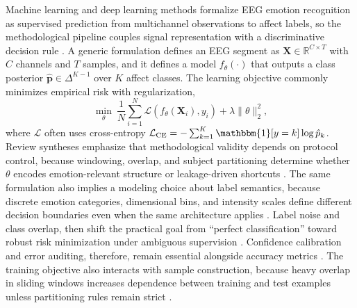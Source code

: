 \documentclass{WileyMSP-template}
\begin{document}
Machine learning and deep learning methods formalize EEG emotion recognition as supervised prediction from multichannel observations to affect labels, so the methodological pipeline couples signal representation with a discriminative decision rule \cite{smalar2019emotions}. A generic formulation defines an EEG segment as $\mathbf{X}\in\mathbb{R}^{C\times T}$ with $C$ channels and $T$ samples, and it defines a model $f_\theta(\cdot)$ that outputs a class posterior $\hat{\mathbf{p}}\in\Delta^{K-1}$ over $K$ affect classes. The learning objective commonly minimizes empirical risk with regularization,
\begin{equation}
\min_{\theta}\ \frac{1}{N}\sum_{i=1}^{N}\mathcal{L}\!\left(f_{\theta}(\mathbf{X}_i),y_i\right)+\lambda\lVert\theta\rVert_2^2,
\end{equation}
where $\mathcal{L}$ often uses cross-entropy $\mathcal{L}_{\text{CE}}=-\sum_{k=1}^{K}\mathbbm{1}[y=k]\log \hat{p}_k$. Review syntheses emphasize that methodological validity depends on protocol control, because windowing, overlap, and subject partitioning determine whether $\theta$ encodes emotion-relevant structure or leakage-driven shortcuts \cite{megger2019emotionr}. The same formulation also implies a modeling choice about label semantics, because discrete emotion categories, dimensional bins, and intensity scales define different decision boundaries even when the same architecture applies \cite{wlizzh2021physiolo,ctanfs2018asurveyo}. Label noise and class overlap, then shift the practical goal from ``perfect classification'' toward robust risk minimization under ambiguous supervision \cite{jwitte2020comparis}. Confidence calibration and error auditing, therefore, remain essential alongside accuracy metrics \cite{shkimh2021asemoaut,jcheng2021emotionr}. The training objective also interacts with sample construction, because heavy overlap in sliding windows increases dependence between training and test examples unless partitioning rules remain strict \cite{nssuha2020eegbased}.
\end{document}
